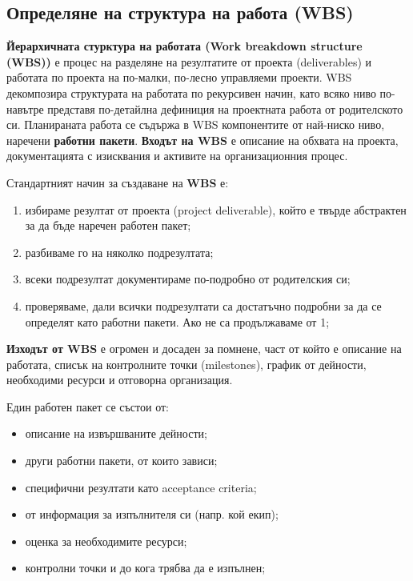 \documentclass[fleqn,12pt]{article}
\begin{document}
\subsection{Определяне на структура на работа (WBS)}

\textbf{Йерархичната стурктура на работата (Work breakdown structure (WBS))} е процес на разделяне на резултатите от проекта (deliverables) и работата по проекта на по-малки, по-лесно управляеми проекти.
WBS декомпозира структурата на работата по рекурсивен начин, като всяко ниво по-навътре представя по-детайлна дефиниция на проектната работа от родителското си.
Планираната работа се съдържа в WBS компонентите от най-ниско ниво, наречени \textbf{работни пакети}.
\bigbreak
\textbf{Входът на WBS} е описание на обхвата на проекта, документацията с изисквания и активите на организационния процес.
\bigbreak

Стандартният начин за създаване на \textbf{WBS} е:
\begin{enumerate}
    \item избираме резултат от проекта (project deliverable), който е твърде абстрактен за да бъде наречен работен пакет;
    \item разбиваме го на няколко подрезултата;
    \item всеки подрезултат документираме по-подробно от родителския си;
    \item проверяваме, дали всички подрезултати са достатъчно подробни за да се определят като работни пакети. Ако не са продължаваме от 1;
\end{enumerate}

\textbf{Изходът от WBS} е огромен и досаден за помнене, част от който е описание на работата, списък на контролните точки (milestones), график от дейности, необходими ресурси и отговорна организация.
\bigbreak

Един работен пакет се състои от:
\begin{itemize}
    \item описание на извършваните дейности;
    \item други работни пакети, от които зависи;
    \item специфични резултати като acceptance criteria;
    \item от информация за изпълнителя си (напр. кой екип);
    \item оценка за необходимите ресурси;
    \item контролни точки и до кога трябва да е изпълнен;
\end{itemize}
\bigbreak
\end{document}
